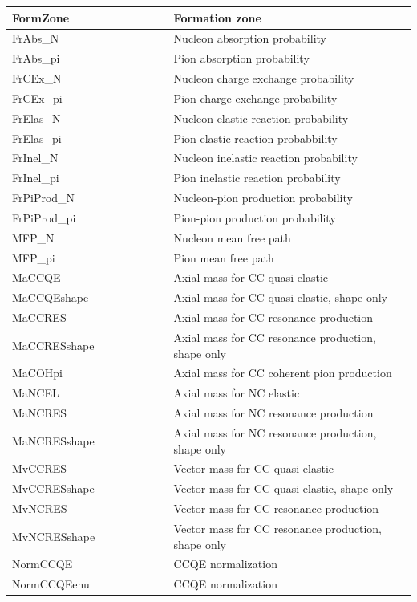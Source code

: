 {\begin{longtable}{|p{0.4\linewidth}|p{0.6\linewidth}|}
 FormZone & Formation zone \\ \hline
 FrAbs\_N & Nucleon absorption probability \\ \hline
 FrAbs\_pi &Pion absorption probability \\ \hline
 FrCEx\_N & Nucleon charge exchange probability \\ \hline
 FrCEx\_pi & Pion charge exchange probability \\ \hline
 FrElas\_N & Nucleon elastic reaction probability \\ \hline
 FrElas\_pi & Pion elastic reaction probabbility \\ \hline
 FrInel\_N & Nucleon inelastic reaction probability \\ \hline
 FrInel\_pi &Pion inelastic reaction probability \\ \hline
 FrPiProd\_N &Nucleon-pion production probability  \\ \hline
 FrPiProd\_pi &Pion-pion production probability \\ \hline
 MFP\_N & Nucleon mean free path \\ \hline
 MFP\_pi & Pion mean free path \\ \hline
 MaCCQE & Axial mass for CC quasi-elastic \\ \hline
 MaCCQEshape & Axial mass for CC quasi-elastic, shape only \\ \hline
 MaCCRES & Axial mass for CC resonance production \\ \hline
 MaCCRESshape & Axial mass for CC resonance production, shape only \\ \hline
 MaCOHpi & Axial mass for CC coherent pion production \\ \hline
 MaNCEL & Axial mass for NC elastic \\ \hline
 MaNCRES & Axial mass for NC resonance production \\ \hline
 MaNCRESshape & Axial mass for NC resonance production, shape only \\ \hline
 MvCCRES & Vector mass for CC quasi-elastic \\ \hline
 MvCCRESshape & Vector mass for CC quasi-elastic, shape only \\ \hline
 MvNCRES & Vector mass for CC resonance production \\ \hline
 MvNCRESshape & Vector mass for CC resonance production, shape only \\ \hline
 NormCCQE & CCQE normalization \\ \hline
 NormCCQEenu & CCQE normalization \\ \hline

\end{longtable}}
